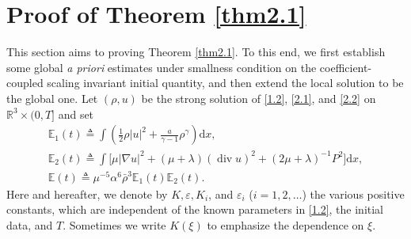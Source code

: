\documentclass[11pt]{article}
\DeclareMathOperator{\divv}{div}
\begin{document}
\section{Proof of Theorem \ref{thm2.1}}\label{sec4}

This section aims to proving Theorem \ref{thm2.1}. To this end, we first establish some global {\it a priori} estimates under smallness condition on the coefficient-coupled scaling invariant initial quantity, and then extend the local solution to be the global one.
Let $(\rho,u)$ be the strong solution of \eqref{1.2}, \eqref{2.1}, and \eqref{2.2} on $\mathbb{R}^3 \times (0,T]$ and set
\begin{gather*}
\mathbb{E}_1 (t)
\triangleq \int \left(\frac{1}{2} \rho |u|^2 + \frac{a}{\gamma - 1} \rho^{\gamma} \right) \mathrm{d} x,
\\
\mathbb{E}_2 (t)
\triangleq \int \big[\mu |\nabla u|^2 + (\mu + \lambda )(\divv u)^2 + \left(2 \mu + \lambda \right)^{-1}P^2 \big] \mathrm{d} x,
\\
\mathbb{E} (t) \triangleq \mu^{-5} \alpha^{6} \bar{\rho}^{3} \mathbb{E}_1 (t) \mathbb{E}_2 (t).
\end{gather*}
Here and hereafter, we denote by $K, \varepsilon, K_i$, and $\varepsilon_i$ ($i=1, 2, \ldots$) the various positive constants, which are independent of the known parameters in \eqref{1.2}, the initial data, and $T$. Sometimes we write $K(\xi)$ to emphasize the dependence on $\xi$.
\end{document}
